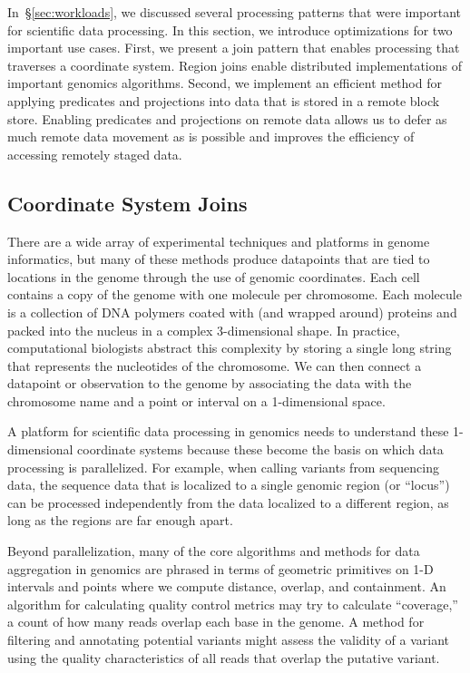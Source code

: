 \documentclass{sig-alternate}
\begin{document}
In~\S\ref{sec:workloads}, we discussed several processing patterns that were important for scientific
data processing. In this section, we introduce optimizations for two important use cases. First, we present
a join pattern that enables processing that traverses a coordinate system. Region joins enable distributed
implementations of important genomics algorithms. Second, we implement an efficient method for
applying predicates and projections into data that is stored in a remote block store. Enabling predicates
and projections on remote data allows us to defer as much remote data movement as is possible and
improves the efficiency of accessing remotely staged data.

\subsection{Coordinate System Joins}
\label{sec:coordinate-system-joins}

There are a wide array of experimental techniques and platforms in genome informatics, but many of these
methods produce datapoints that are tied to locations in the genome through the use of genomic coordinates.
Each cell contains a copy of the genome with one molecule per chromosome. Each molecule is a collection of
DNA polymers coated with (and wrapped around) proteins and packed into the nucleus in a complex
3-dimensional shape. In practice, computational biologists abstract this complexity by storing a single long
string that represents the nucleotides of the chromosome. We can then connect a datapoint or observation to the
genome by associating the data with the chromosome name and a point or interval on a 1-dimensional space.

A platform for scientific data processing in genomics needs to understand these 1-dimensional coordinate
systems because these become the basis on which data processing is parallelized. For example, when calling
variants from sequencing data, the sequence data that is localized to a single genomic region (or ``locus'') can be 
processed independently from the data localized to a different region, as long as the regions are far enough
apart.

Beyond parallelization, many of the core algorithms and methods for data aggregation in genomics are phrased
in terms of geometric primitives on 1-D intervals and points where we compute distance, overlap, and
containment.  An algorithm for calculating quality control metrics may try to calculate ``coverage,'' a count
of how many reads overlap each base in the genome. A method for filtering and annotating potential variants
might assess the validity of a variant using the quality characteristics of all reads that overlap the putative variant.
\end{document}
